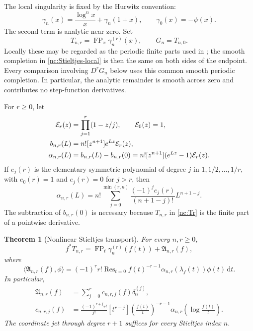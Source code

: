 \documentclass[11pt,a4paper]{article}
\numberwithin{equation}{section}
\newtheorem{theorem}{Theorem}[section]
\theoremstyle{definition}
\theoremstyle{remark}
\DeclareMathOperator{\FP}{FP}
\DeclareMathOperator{\Res}{Res}
\newcommand{\dd}{\,\mathrm d}
\begin{document}
The local singularity is fixed by the Hurwitz convention:
\begin{equation}\label{nc:Stieltjes-local}
 \gamma_n(x)=\frac{\log^n x}{x}+\gamma_n(1+x),
 \qquad \gamma_0(x)=-\psi(x).
\end{equation}
The second term is analytic near zero. Set
\begin{equation}\label{nc:Tr}
 T_{n,r}=\FP_x\gamma_n^{(r)}(x),\qquad G_n=T_{n,0}.
\end{equation}
Locally these may be regarded as the periodic finite parts used in
\cite{incoming-md,incoming-sh}; the smooth completion in
\eqref{nc:Stieltjes-local} is then the same on both sides of the
endpoint. Every comparison involving $D^rG_n$ below uses this common
smooth periodic completion. In particular, the analytic remainder is
smooth across zero and contributes no step-function derivatives.

For $r\geq0$, let
\begin{align}
 \mathcal E_r(z)&=\prod_{j=1}^r(1-z/j),\qquad \mathcal E_0(z)=1,
       \label{nc:Er}\\
 b_{n,r}(L)&=n![z^{n+1}]e^{Lz}\mathcal E_r(z),\notag\\
 \alpha_{n,r}(L)&=b_{n,r}(L)-b_{n,r}(0)
       =n![z^{n+1}](e^{Lz}-1)\mathcal E_r(z).
       \label{nc:alpha}
\end{align}
If $e_j(r)$ is the elementary symmetric polynomial of degree $j$ in
$1,1/2,\ldots,1/r$, with $e_0(r)=1$ and $e_j(r)=0$ for $j>r$, then
\begin{equation}\label{nc:alpha-finite}
 \alpha_{n,r}(L)=n!\sum_{j=0}^{\min(r,n)}
      \frac{(-1)^je_j(r)}{(n+1-j)!}L^{n+1-j}.
\end{equation}
The subtraction of $b_{n,r}(0)$ is necessary because $T_{n,r}$ in
\eqref{nc:Tr} is the finite part of a pointwise derivative.

\begin{theorem}[Nonlinear Stieltjes transport]
\label{nc:Stieltjes}
For every $n,r\geq0$,
\begin{equation}\label{nc:Stieltjes-law}
 f^*T_{n,r}=\FP_t\gamma_n^{(r)}(f(t))+\mathfrak A_{n,r}(f),
\end{equation}
where
\begin{equation}\label{nc:Stieltjes-residue}
 \langle\mathfrak A_{n,r}(f),\phi\rangle
   =(-1)^rr!\Res_{t=0}
     f(t)^{-r-1}\alpha_{n,r}(\lambda_f(t))\phi(t)\dd t.
\end{equation}
In particular,
\begin{align}
 \mathfrak A_{n,r}(f)&=\sum_{j=0}^r c_{n,r,j}(f)\delta_0^{(j)},
       \label{nc:finite-delta}\\
 c_{n,r,j}(f)&=\frac{(-1)^{r+j}r!}{j!}
   [t^{r-j}]\left(\frac{f(t)}t\right)^{-r-1}
       \alpha_{n,r}\!\left(\log\frac{f(t)}t\right).
       \label{nc:coefficient}
\end{align}
The coordinate jet through degree $r+1$ suffices for every Stieltjes
index $n$.
\end{theorem}
\end{document}
